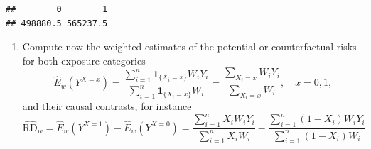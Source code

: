 \documentclass[
]{book}
\newenvironment{Shaded}{\begin{snugshade}}{\end{snugshade}}
\newcommand{\DecValTok}[1]{\textcolor[rgb]{0.00,0.00,0.81}{#1}}
\newcommand{\FunctionTok}[1]{\textcolor[rgb]{0.13,0.29,0.53}{\textbf{#1}}}
\newcommand{\NormalTok}[1]{#1}
\newcommand{\OtherTok}[1]{\textcolor[rgb]{0.56,0.35,0.01}{#1}}
\newcommand{\SpecialCharTok}[1]{\textcolor[rgb]{0.81,0.36,0.00}{\textbf{#1}}}
\providecommand{\tightlist}{%
  \setlength{\itemsep}{0pt}\setlength{\parskip}{0pt}}
\begin{document}
\begin{Shaded}
\end{Shaded}

\begin{verbatim}
##        0        1 
## 498880.5 565237.5
\end{verbatim}

\begin{enumerate}
\def\labelenumi{\arabic{enumi}.}
\setcounter{enumi}{3}
\tightlist
\item
  Compute now the weighted estimates of the
  potential or counterfactual risks for
  both exposure categories
  \[ \widehat{E}_w(Y^{X = x}) =
  \frac{ \sum_{i=1}^n {\mathbf 1}_{ \{X_i=x\} } W_i Y_i }
     {\sum_{i=1}^n {\mathbf 1}_{ \{X_i=x\} }W_i} =
   \frac{ \sum_{X_i = x} W_i Y_i }{\sum_{X_i=x} W_i}, \quad x = 0,1, \]
  and their causal contrasts, for instance
  \[ \widehat{\text{RD}}_{w} = \widehat{E}_w(Y^{X = 1}) -
                \widehat{E}_w(Y^{X = 0})
    =  \frac{ \sum_{i=1}^n X_i W_i Y_i }{\sum_{i=1}^n X_i W_i} -
    \frac{ \sum_{i=1}^n (1-X_i) W_i Y_i }{\sum_{i=1}^n (1-X_i) W_i}
  \]
\end{enumerate}

\begin{Shaded}
\end{Shaded}
\end{document}
